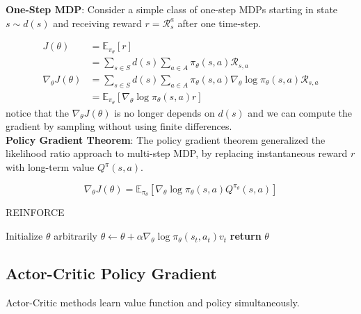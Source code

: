 \noindent \textbf{One-Step MDP}: Consider a simple class of one-step MDPs starting in state $s
    \sim d(s)$ and receiving reward $r = \mathcal{R}_s^a$ after one time-step.

\begin{align*}
    J(\theta)               & = \mathbb{E}_{\pi_\theta}[r]                                                                              \\
                            & = \sum_{s \in S} d(s) \sum_{a \in A} \pi_\theta(s,a) \mathcal{R}_{s,a}                                    \\
    \nabla_\theta J(\theta) & = \sum_{s \in S} d(s) \sum_{a \in A} \pi_\theta(s,a) \nabla_\theta \log \pi_\theta(s,a) \mathcal{R}_{s,a} \\
                            & = \mathbb{E}_{\pi_\theta}[\nabla_\theta \log \pi_\theta(s,a) r]
\end{align*}
notice that the $\nabla_\theta J(\theta)$ is no longer depends on $d(s)$ and we can compute the gradient by sampling without using finite differences.\\

\noindent \textbf{Policy Gradient Theorem}: The policy gradient theorem generalized the likelihood
ratio approach to multi-step MDP, by replacing instantaneous reward $r$ with
long-term value $Q^\pi(s,a)$.

\[
    \nabla_\theta J(\theta) = \mathbb{E}_{\pi_\theta}[\nabla_\theta \log \pi_\theta(s,a) Q^{\pi_\theta}(s,a)]
\]

\begin{algorithm}[H]
    \caption{REINFORCE}
    \begin{algorithmic}
        \State Initialize $\theta$ arbitrarily
        \State $\theta \leftarrow \theta + \alpha \nabla_\theta \log \pi_\theta(s_t, a_t) v_t$
        \EndFor
        \EndFor
        \State \textbf{return} $\theta$
    \end{algorithmic}
\end{algorithm}

\subsection{Actor-Critic Policy Gradient}

Actor-Critic methods learn value function and policy simultaneously.
